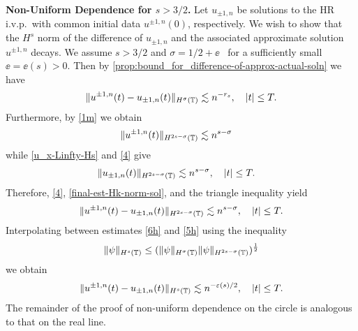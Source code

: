 \textbf{Non-Uniform Dependence for $s > 3/2$.}
%
%
%
Let $u_{\pm 1, n}$ be solutions to the HR i.v.p.\ with common initial data 
$u^{\pm 1,
n}(0)$, respectively.
We wish to show that the $H^s$ norm of the difference of $u_{\pm 1,
n}$ and the associated approximate solution $u^{\pm 1, n}$ decays.
We assume
$s > 3/2 $ and $\sigma = 1/2 + \ee$ \ for a sufficiently small
$\ee= \ee(s) > 0$. 
Then by \cref{prop:bound_for_difference-of-approx-actual-soln} we 
have
%
%
\begin{equation}
\begin{split}
\|u^{\pm 1, n}(t) - u_{\pm 1, n} (t) \|_{H^\sigma (\mathbb{T})} \lesssim n^{-r_s}
\label{6h}, \quad |t| \le T.
\end{split}
\end{equation}
%
%
Furthermore, by \eqref{1m} we obtain
%
%
\begin{equation}
\begin{split}
\|u^{\pm 1, n} (t) \|_{H^{2s - \sigma} (\mathbb{T})}
& \lesssim n^{s-\sigma}
\label{4}
\end{split}
\end{equation}
%
%
while \eqref{u_x-Linfty-Hs} and \eqref{4} give
\begin{equation}
\begin{split}
\|u_{\pm 1, n} (t) \|_{H^{2s - \sigma}(\mathbb{T})}
& \lesssim n^{s- \sigma}, \quad |t| \le T.
\label{final-est-Hk-norm-sol}
\end{split}
\end{equation}
%
%
%
%
%
%
%
Therefore, \eqref{4}, \eqref{final-est-Hk-norm-sol}, and the triangle
inequality yield
%
%
\begin{equation}
\begin{split}
\|u^{\pm 1, n} (t) - u_{\pm 1, n}(t)\|_{H^{2s - \sigma}(\mathbb{T})}
\lesssim n^{s-\sigma}, \quad |t| \le T.
\label{5h}
\end{split}
\end{equation}
%
%
%
%
Interpolating between estimates \eqref{6h} and \eqref{5h} using the 
inequality
%
\begin{equation*}
\|\psi \|_{H^s (\mathbb{T})} \leq  (\| \psi \|_{H^\sigma (\mathbb{T})} \| \psi
\|_{H^{2s-\sigma}(\mathbb{T})})^\frac12
\end{equation*}
%
%
we obtain
%
%
\begin{equation}
\begin{split}
\|u^{\pm 1,n}(t) - u_{\pm 1, n}(t) \|_{H^s (\mathbb{T})} \lesssim
n^{-\varepsilon(s)/2}, \quad |t| \le T.
\label{10h}
\end{split}
\end{equation}
%
%
The remainder of the proof of non-uniform dependence on the circle is
analogous to that on the real line. \qquad \qedsymbol
%
%
%
%
%
%
%
%
%
